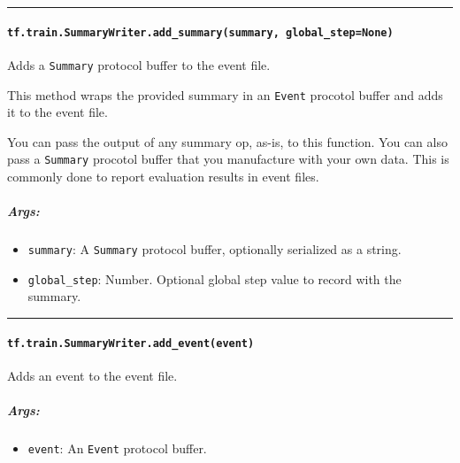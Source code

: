 \begin{center}\rule{0.5\linewidth}{\linethickness}\end{center}

\paragraph{\texorpdfstring{\texttt{tf.train.SummaryWriter.add\_summary(summary,\ global\_step=None)}
}{tf.train.SummaryWriter.add\_summary(summary, global\_step=None) }}\label{tf.train.summarywriter.addux5fsummarysummary-globalux5fstepnone}

Adds a \texttt{Summary} protocol buffer to the event file.

This method wraps the provided summary in an \texttt{Event} procotol
buffer and adds it to the event file.

You can pass the output of any summary op, as-is, to this function. You
can also pass a \texttt{Summary} procotol buffer that you manufacture
with your own data. This is commonly done to report evaluation results
in event files.

\subparagraph{Args: }\label{args-37}

\begin{itemize}
\tightlist
\item
  \texttt{summary}: A \texttt{Summary} protocol buffer, optionally
  serialized as a string.
\item
  \texttt{global\_step}: Number. Optional global step value to record
  with the summary.
\end{itemize}

\begin{center}\rule{0.5\linewidth}{\linethickness}\end{center}

\paragraph{\texorpdfstring{\texttt{tf.train.SummaryWriter.add\_event(event)}
}{tf.train.SummaryWriter.add\_event(event) }}\label{tf.train.summarywriter.addux5feventevent}

Adds an event to the event file.

\subparagraph{Args: }\label{args-38}

\begin{itemize}
\tightlist
\item
  \texttt{event}: An \texttt{Event} protocol buffer.
\end{itemize}

